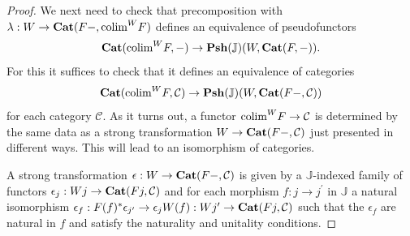 \documentclass[12pt,oneside,reqno,a4paper]{article}
\theoremstyle{definition}
\newcommand{\Cat}{\textbf{\textup{Cat}}}
\newcommand{\Psh}[1]{\textbf{\textup{Psh}}(#1)}
\newcommand{\C}{\mathcal{C}}
\newcommand{\bJ}{\mathbb{J}}
\newcommand{\p}{^\prime}
\newcommand{\colim}{\textup{colim}}
\begin{document}
\begin{proof}
We next need to check that precomposition with $\lambda: W \to \Cat(F-,\colim^W F)$ defines an equivalence of pseudofunctors
\begin{align*}
\Cat(\colim^W F,-)\to \Psh{\bJ}(W,\Cat(F,-)).
\end{align*}
For this it suffices to check that it defines an equivalence of categories
\begin{align*}
\Cat(\colim^W F,\C)\to \Psh{\bJ}(W,\Cat(F-,\C))
\end{align*}
for each category $\C$. As it turns out, a functor $\colim^W F\to \C$ is determined by the same data as a strong transformation $W\to \Cat(F-,\C)$ just presented in different ways. This will lead to an isomorphism of categories.

A strong transformation $\epsilon:W\to\Cat(F-,\C)$ is given by a $\bJ$-indexed family of functors $\epsilon_j:Wj\to\Cat(Fj,\C)$ and for each morphism $f:j\to j\p$ in $\bJ$ a natural isomorphism $\epsilon_f:F(f)^*\epsilon_{j\p}\to\epsilon_j W(f):Wj\p\to\Cat(Fj,\C)$ such that the $\epsilon_f$ are natural in $f$ and satisfy the naturality and unitality conditions.


\end{proof}
\end{document}
